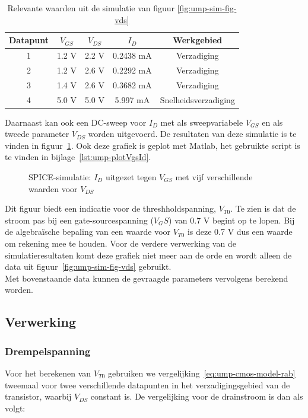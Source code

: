 \documentclass{scrartcl}
\begin{document}
\begin{table}[H]
	\centering
	\caption{Relevante waarden uit de simulatie van figuur \ref{fig:ump-sim-fig-vds}}
	\label{tab:ump-sim-tab-vds}
	\begin{tabular}{|c|c|c|c|c|} 	
		\hline
		Datapunt & $V_{GS}$ & $V_{DS}$ & $I_{D}$ & Werkgebied \\
		\hline
		1 & 1.2 V & 2.2 V & 0.2438 mA & Verzadiging \\
		\hline
		2 & 1.2 V & 2.6 V & 0.2292 mA & Verzadiging \\
		\hline
		3 & 1.4 V & 2.6 V & 0.3682 mA & Verzadiging \\
		\hline
		4 & 5.0 V & 5.0 V & 5.997 mA & Snelheidsverzadiging \\
		\hline	
	\end{tabular}
\end{table}

Daarnaast kan ook een DC-sweep voor $I_{D}$ met als sweepvariabele $V_{GS}$ en als tweede parameter $V_{DS}$ worden uitgevoerd. De resultaten van deze simulatie is te vinden in figuur~\ref{fig:ump-sim-fig-vgs}. Ook deze grafiek is geplot met Matlab, het gebruikte script is te vinden in bijlage~\ref{lst:ump-plotVgsId}.

\begin{figure}[H]
	\centering
	\setlength{} 
	\setlength{}
	
	\caption{SPICE-simulatie: $I_{D}$ uitgezet tegen $V_{GS}$ met vijf verschillende waarden voor $V_{DS}$}
	\label{fig:ump-sim-fig-vgs}
\end{figure}

Dit figuur biedt een indicatie voor de threshholdspanning, $V_{T0}$. Te zien is dat de stroom pas bij een gate-sourcespanning ($V_GS$) van 0.7 V begint op te lopen. Bij de algebraïsche bepaling van een waarde voor $V_{T0}$ is deze 0.7 V dus een waarde om rekening mee te houden. Voor de verdere verwerking van de simulatieresultaten komt deze grafiek niet meer aan de orde en wordt alleen de data uit figuur~\ref{fig:ump-sim-fig-vds} gebruikt.
\\

Met bovenstaande data kunnen de gevraagde parameters vervolgens berekend worden.

\subsection{Verwerking}
\label{subsec:ump-methode-verw}
\subsubsection{Drempelspanning}
\label{subsubsec:ump-methode-verw-vt0}
Voor het berekenen van $V_{T0}$ gebruiken we vergelijking~\ref{eq:ump-cmos-model-rab} tweemaal voor twee verschillende datapunten in het verzadigingsgebied van de transistor, waarbij $V_{DS}$ constant is. De vergelijking voor de drainstroom is dan als volgt:
\end{document}
